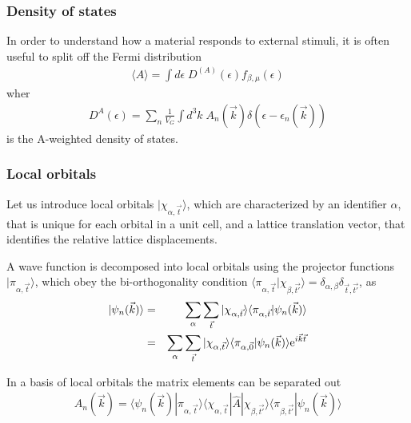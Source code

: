 \documentclass[11pt,a4paper]{report}
\begin{document}
\subsubsection{Density of states}
In order to understand how a material responds to external stimuli, it
is often useful to split off the Fermi distribution
\begin{eqnarray}
\langle{A}\rangle=\int d\epsilon\; D^{(A)}(\epsilon)
f_{\beta,\mu}(\epsilon)
\end{eqnarray}
wher
\begin{eqnarray}
D^{A}(\epsilon)=
\sum_n\frac{1}{V_G}\int d^3k\; A_{n}(\vec{k})\delta(\epsilon-\epsilon_n(\vec{k}))
\end{eqnarray}
is the A-weighted density of states.

\subsubsection{Local orbitals}
Let us introduce local orbitals $|\chi_{\alpha,\vec{t}}\rangle$, which
are characterized by an identifier $\alpha$, that is unique for each
orbital in a unit cell, and a lattice translation vector, that
identifies the relative lattice displacements.

A wave function is decomposed into local orbitals using the projector
functions $|\pi_{\alpha,\vec{t}}\rangle$, which obey the
bi-orthogonality condition
$\langle\pi_{\alpha,\vec{t}}|\chi_{\beta,\vec{t'}}\rangle=\delta_{\alpha,\beta}
\delta_{\vec{t},\vec{t'}}$, as
\begin{eqnarray}
|\psi_n(\vec{k})\rangle
&=&\sum_{\alpha}\sum_{\vec{t}}
|\chi_{\alpha,\vec{t}}\rangle
\langle\pi_{\alpha,\vec{t}}|\psi_n(\vec{k})\rangle
\nonumber\\
&=&\sum_{\alpha}\sum_{\vec{t}}
|\chi_{\alpha,\vec{t}}\rangle
\langle\pi_{\alpha,\vec{0}}|\psi_n(\vec{k})\rangle\mathrm{e}^{i\vec{k}\vec{t}}
\end{eqnarray}

In a basis of local orbitals the matrix elements can be separated out
\begin{eqnarray}
A_{n}(\vec{k})=\langle\psi_n(\vec{k})|\pi_{\alpha,\vec{t}}\rangle
\langle\chi_{\alpha,\vec{t}}|\hat{A}|\chi_{\beta,\vec{t'}}\rangle
\langle\pi_{\beta,\vec{t'}}|\psi_n(\vec{k})\rangle
\end{eqnarray}
\end{document}
